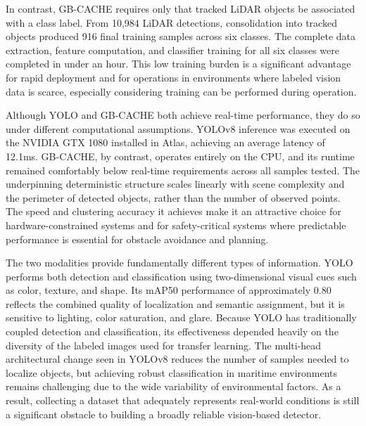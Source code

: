 \documentclass{erauthesis}
\begin{document}
In contrast, GB-CACHE requires only that tracked LiDAR objects be associated with a class label.
From 10,984 LiDAR detections, consolidation into tracked objects produced 916 final training samples across six classes.
The complete data extraction, feature computation, and classifier training for all six classes were completed in under an hour. 
This low training burden is a significant advantage for rapid deployment and for operations in environments where labeled vision data is scarce, especially considering training can be performed during operation.


Although YOLO and GB-CACHE both achieve real-time performance, they do so under different computational assumptions.
YOLOv8 inference was executed on the NVIDIA GTX 1080 installed in Atlas, achieving an average latency of 12.1ms.
GB-CACHE, by contrast, operates entirely on the CPU, and its runtime remained comfortably below real-time requirements across all samples tested. The underpinning deterministic structure scales linearly with scene complexity and the perimeter of detected objects, rather than the number of observed points.
The speed and clustering accuracy it achieves make it an attractive choice for hardware-constrained systems and for safety-critical systems where predictable performance is essential for obstacle avoidance and planning.


The two modalities provide fundamentally different types of information.
YOLO performs both detection and classification using two-dimensional visual cues such as color, texture, and shape. Its mAP50 performance of approximately 0.80 reflects the combined quality of localization and semantic assignment, but it is sensitive to lighting, color saturation, and glare. Because YOLO has traditionally coupled detection and classification, its effectiveness depended heavily on the diversity of the labeled images used for transfer learning. The multi-head architectural change seen in YOLOv8 reduces the number of samples needed to localize objects, but achieving robust classification in maritime environments remains challenging due to the wide variability of environmental factors. As a result, collecting a dataset that adequately represents real-world conditions is still a significant obstacle to building a broadly reliable vision-based detector.
\end{document}
